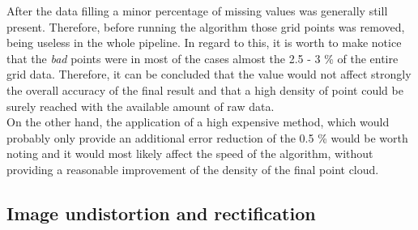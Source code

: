 After the data filling a minor percentage of missing values was generally still present. 
Therefore, before running the algorithm those grid points was removed, being useless in the whole pipeline.
In regard to this, it is worth to make notice that the \textit{bad} points were in most of the cases almost the 2.5 - 3 \% of the entire grid data. 
Therefore, it can be concluded that the value would not affect strongly the overall accuracy of the final result and that a high density of point could be surely reached with the available amount of raw data.\\
On the other hand, the application of a high expensive method, which would probably only provide an additional error reduction of the 0.5 \% would be worth noting and it would most likely affect the speed of the algorithm, without providing a reasonable improvement of the density of the final point cloud.\\

\subsection{Image undistortion and rectification}
\label{subsection:img-undist-and-rectific}

